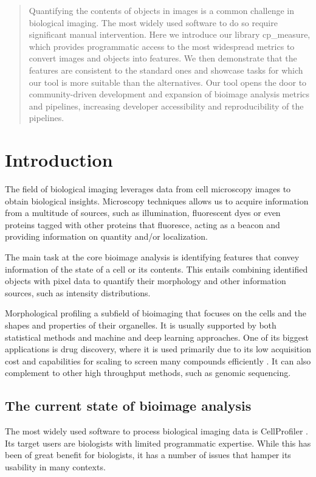 \documentclass{article}
\begin{document}
\begin{abstract}
Quantifying the contents of objects in images is a common challenge in biological imaging. The most widely used software to do so require significant manual intervention. Here we introduce our library cp\_measure, which provides programmatic access to the most widespread metrics to convert images and objects into features. We then demonstrate that the features are consistent to the standard ones and showcase tasks for which our tool is more suitable than the alternatives. Our tool opens the door to community-driven  development and expansion of bioimage analysis metrics and pipelines, increasing developer accessibility and reproducibility of the pipelines.
\end{abstract}
\section{Introduction}
\label{sec:org4c9ba67}
The field of biological imaging leverages data from cell microscopy images to obtain biological insights. Microscopy techniques allows us to acquire information from a multitude of sources, such as illumination, fluorescent dyes or even proteins tagged with other proteins that fluoresce, acting as a beacon and providing information on quantity and/or localization.

The main task at the core bioimage analysis is identifying features that convey information of the state of a cell or its contents. This entails combining identified objects with pixel data to quantify their morphology and other information sources, such as intensity distributions.

Morphological profiling a subfield of bioimaging that focuses on the cells and the shapes and properties of their organelles. It is usually supported by both statistical methods and machine and deep learning approaches. One of its biggest applications is drug discovery, where it is used primarily due to its low acquisition cost and capabilities for scaling to screen many compounds efficiently \citep{sealDecadeSystematicReview2024}. It can also complement to other high throughput methods, such as genomic sequencing.
\subsection{The current state of bioimage analysis}
\label{sec:org8f5b33d}
The most widely used software to process biological imaging data is CellProfiler \citep{stirlingCellProfiler4Improvements2021}. Its target users are biologists with limited programmatic expertise. While this has been of great benefit for biologists, it has a number of issues that hamper its usability in many contexts.
\end{document}
